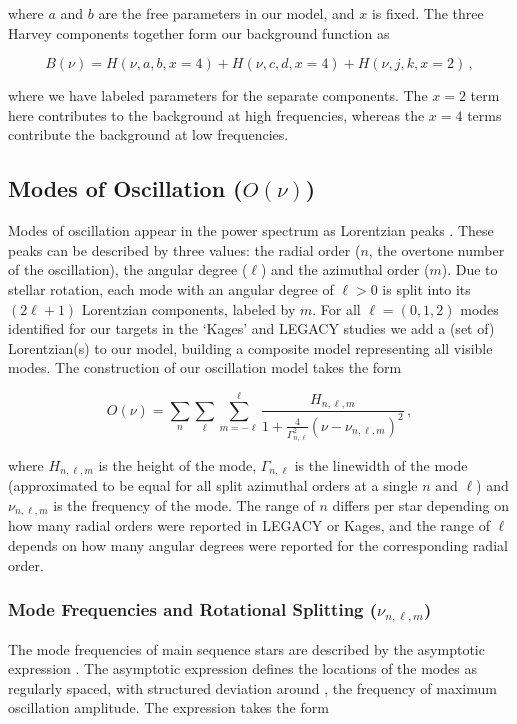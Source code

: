\noindent where $a$ and $b$ are the free parameters in our model, and $x$ is fixed. The three Harvey components together form our background function as

\begin{equation}\label{eq:background}
	B(\nu) = H(\nu, a, b, x=4) + H(\nu, c, d, x=4) + H(\nu, j, k, x=2)\, ,
\end{equation}

\noindent where we have labeled parameters for the separate components. The $x = 2$ term here contributes to the background at high frequencies, whereas the $x=4$ terms contribute the background at low frequencies.

\subsection{Modes of Oscillation ($O(\nu)$)}
Modes of oscillation appear in the power spectrum as Lorentzian peaks \cite{chaplin+basu2017}. These peaks can be described by three values: the radial order ($n$, the overtone number of the oscillation), the angular degree ($\ell$) and the azimuthal order ($m$). Due to stellar rotation, each mode with an angular degree of $\ell > 0$ is split into its $(2\ell +1)$ Lorentzian components, labeled by $m$. For all $\ell=(0,1,2)$ modes identified for our targets in the  `Kages'  and LEGACY studies \cite{davies+2016,lund+2017} we add a (set of) Lorentzian(s) to our model, building a composite model representing all visible modes. The construction of our oscillation model takes the form

\begin{equation}
	O(\nu) = \sum_n \sum_\ell \sum_{m=-\ell}^\ell \frac{H_{n,\ell,m}}{1 + \frac{4}{\Gamma^2_{n,\ell}}(\nu - \nu_{n,\ell,m})^2}\, ,
\end{equation}

\noindent where $H_{n,\ell,m}$ is the height of the mode, $\Gamma_{n,\ell}$ is the linewidth of the mode (approximated to be equal for all split azimuthal orders at a single $n$ and $\ell$) and $\nu_{n, \ell, m}$ is the frequency of the mode. The range of $n$ differs per star depending on how many radial orders were reported in LEGACY or Kages, and the range of $\ell$ depends on how many angular degrees were reported for the corresponding radial order.

\subsubsection{Mode Frequencies and Rotational Splitting ($\nu_{n,\ell,m}$)}\label{ssec:frequencies}
The mode frequencies of main sequence stars are described by the asymptotic expression \cite{tassoul1980, vrard+2016}. The asymptotic expression defines the locations of the modes as regularly spaced, with structured deviation around \numax, the frequency of maximum oscillation amplitude. The expression takes the form

